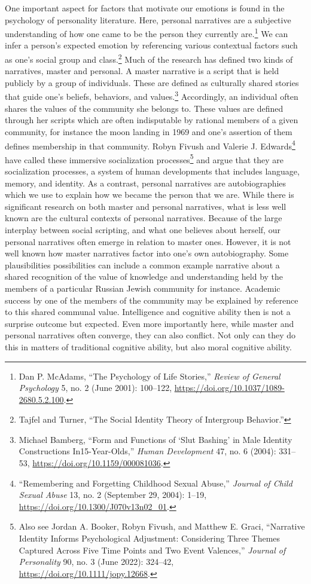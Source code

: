 \documentclass[phdthesis,12pt,final,a4paper]{wuthesis}
\theoremstyle{definition}
\theoremstyle{definition}
\theoremstyle{definition}
\theoremstyle{definition}
\theoremstyle{remark}
\begin{document}
One important aspect for factors that motivate our emotions is found in the psychology of personality literature. Here, personal narratives are a subjective understanding of how one came to be the person they currently are.\footnote{Dan P. McAdams, {``The {Psychology} of {Life Stories},''} \emph{Review of General Psychology} 5, no. 2 (June 2001): 100--122, \url{https://doi.org/10.1037/1089-2680.5.2.100}.} We can infer a person's expected emotion by referencing various contextual factors such as one's social group and class.\footnote{Tajfel and Turner, {``The {Social Identity Theory} of {Intergroup Behavior}.''}} Much of the research has defined two kinds of narratives, master and personal. A master narrative is a script that is held publicly by a group of individuals. These are defined as culturally shared stories that guide one's beliefs, behaviors, and values.\footnote{Michael Bamberg, {``Form and {Functions} of {`{Slut Bashing}'} in {Male Identity Constructions} In15-{Year-Olds},''} \emph{Human Development} 47, no. 6 (2004): 331--53, \url{https://doi.org/10.1159/000081036}.} Accordingly, an individual often shares the values of the community she belongs to. These values are defined through her scripts which are often indisputable by rational members of a given community, for instance the moon landing in 1969 and one's assertion of them defines membership in that community. Robyn Fivush and Valerie J. Edwards\footnote{{``Remembering and {Forgetting Childhood Sexual Abuse},''} \emph{Journal of Child Sexual Abuse} 13, no. 2 (September 29, 2004): 1--19, \url{https://doi.org/10.1300/J070v13n02_01}.} have called these immersive socialization processes\footnote{Also see Jordan A. Booker, Robyn Fivush, and Matthew E. Graci, {``Narrative {Identity Informs Psychological Adjustment}: {Considering} Three Themes Captured Across Five Time Points and Two Event Valences,''} \emph{Journal of Personality} 90, no. 3 (June 2022): 324--42, \url{https://doi.org/10.1111/jopy.12668}.} and argue that they are socialization processes, a system of human developments that includes language, memory, and identity. As a contrast, personal narratives are autobiographies which we use to explain how we became the person that we are. While there is significant research on both master and personal narratives, what is less well known are the cultural contexts of personal narratives. Because of the large interplay between social scripting, and what one believes about herself, our personal narratives often emerge in relation to master ones. However, it is not well known how master narratives factor into one's own autobiography. Some plausibilities possibilities can include a common example narrative about a shared recognition of the value of knowledge and understanding held by the members of a particular Russian Jewish community for instance. Academic success by one of the members of the community may be explained by reference to this shared communal value. Intelligence and cognitive ability then is not a surprise outcome but expected. Even more importantly here, while master and personal narratives often converge, they can also conflict. Not only can they do this in matters of traditional cognitive ability, but also moral cognitive ability.
\end{document}
